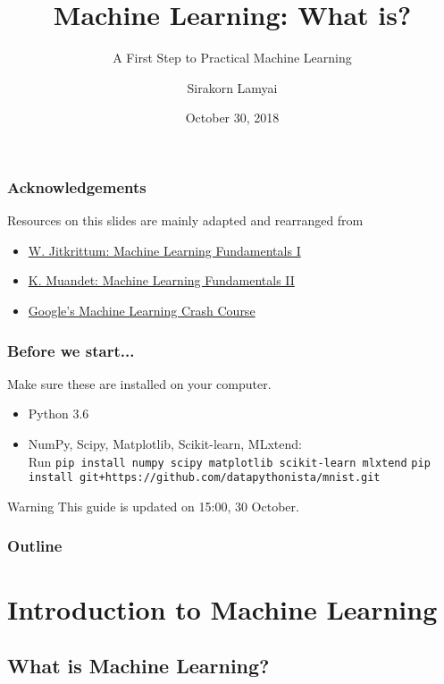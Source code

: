 \documentclass[aspectratio=169]{beamer}
\title{Machine Learning: What is?}
\subtitle{A First Step to Practical Machine Learning}
\author{Sirakorn Lamyai}
\institute{Student, Kasetsart U.}
\date{October 30, 2018}
\begin{document}
\begin{frame}
	\titlepage
\end{frame}

\begin{frame}
	\frametitle{Acknowledgements}
	Resources on this slides are mainly adapted and rearranged from
	\begin{itemize}
		\item \href{https://docs.google.com/presentation/d/1oGIyzoMHT3-TTS23NPL-qzh0EAXb6kyK0S_1n5MjmgQ/edit\#slide=id.p}{W. Jitkrittum: Machine Learning Fundamentals I}
		\item \href{http://krikamol.org/tutorial/slides/vistec-talk-16-March-2018.pdf}{K. Muandet: Machine Learning Fundamentals II}
		\item \href{https://developers.google.com/machine-learning/crash-course/}{Google's Machine Learning Crash Course}
	\end{itemize}
\end{frame}

\begin{frame}
	\frametitle{Before we start...}
	Make sure these are installed on your computer.\\

	\begin{itemize}
		\item Python 3.6
		\item NumPy, Scipy, Matplotlib, Scikit-learn, MLxtend:\\
			  Run \texttt{pip install numpy scipy matplotlib scikit-learn mlxtend}
			  \texttt{pip install git+https://github.com/datapythonista/mnist.git}
	\end{itemize}
	\begin{block}{Warning}
		This guide is updated on 15:00, 30 October.
	\end{block}
\end{frame}

\begin{frame}
	\frametitle{Outline}
	\begin{multicols}{2}
		\tableofcontents
	\end{multicols}
\end{frame}

\section{Introduction to Machine Learning}

\subsection{What is Machine Learning?}
\end{document}
